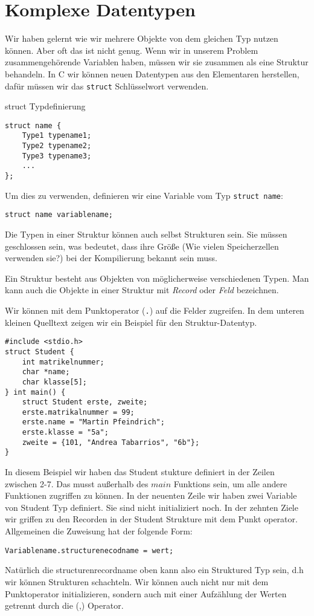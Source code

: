 \section{Komplexe Datentypen}

Wir haben gelernt wie wir mehrere Objekte von dem gleichen Typ nutzen
können. Aber oft das ist nicht genug. Wenn wir in unserem Problem
zusammengehörende Variablen haben, müssen wir sie zusammen 
als eine Struktur behandeln. In C wir können neuen Datentypen aus
den Elementaren herstellen, dafür müssen wir das \texttt{struct} Schlüsselwort
verwenden.

\begin{myalertblock}{struct Typdefinierung}
\begin{lstlisting}
struct name {
    Type1 typename1;
    Type2 typename2;
    Type3 typename3;
    ...
};
\end{lstlisting}

Um dies zu verwenden, definieren wir eine Variable vom Typ \texttt{struct name}:

\begin{lstlisting}
struct name variablename;
\end{lstlisting}

Die Typen in einer Struktur können auch selbst Strukturen sein.
Sie müssen geschlossen sein, was bedeutet, dass ihre Größe
(Wie vielen Speicherzellen verwenden sie?) bei der Kompilierung
bekannt sein muss.
\end{myalertblock}

Ein Struktur besteht aus Objekten von möglicherweise verschiedenen Typen. Man
kann auch die Objekte in einer Struktur mit \emph{Record} oder \emph{Feld}
bezeichnen.

Wir können mit dem Punktoperator (\texttt{.}) auf die Felder zugreifen. In dem
unteren kleinen Quelltext zeigen wir ein Beispiel für den Struktur-Datentyp.

\begin{lstlisting}
#include <stdio.h>
struct Student {
    int matrikelnummer;
    char *name;
    char klasse[5];
} int main() {
    struct Student erste, zweite;
    erste.matrikalnummer = 99;
    erste.name = "Martin Pfeindrich";
    erste.klasse = "5a";
    zweite = {101, "Andrea Tabarrios", "6b"};
}
\end{lstlisting}

In diesem Beispiel wir haben das Student stukture definiert in der Zeilen zwischen 2-7.
Das musst außerhalb des $main$ Funktions sein, um alle andere Funktionen zugriffen zu können.
In der neuenten Zeile wir haben zwei Variable von Student Typ definiert. Sie sind 
nicht initializiert noch. In der zehnten Ziele wir griffen zu den Recorden in der
Student Strukture mit dem Punkt operator. Allgemeinen die Zuweisung hat der folgende Form:
\begin{lstlisting}
Variablename.structurenecodname = wert;
\end{lstlisting}
Natürlich die structurenrecordname oben kann also ein Struktured Typ sein, d.h wir können
Strukturen schachteln. Wir können auch nicht nur mit dem Punktoperator initializieren, sondern
auch mit einer Aufzählung der Werten getrennt durch die (,) Operator.

